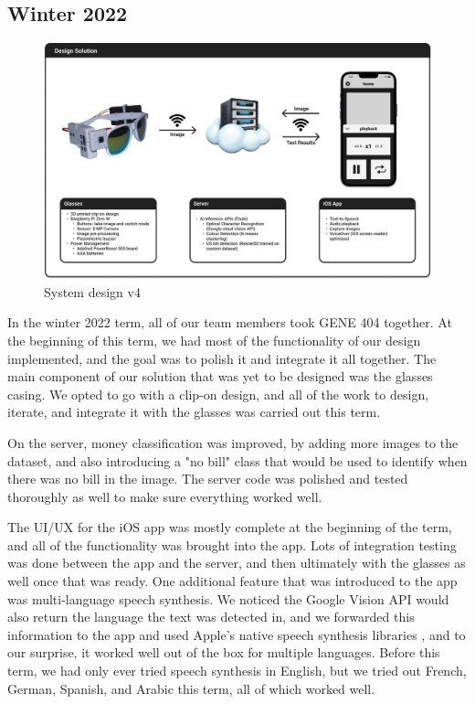 \documentclass[a4paper,11pt]{article}
\begin{document}
\subsection{Winter 2022}
\label{winter-2022-design}
\begin{figure}[H]
\centering
\includegraphics[scale=0.265]{img/system_diagrams/system_diagram_v4.png}
\caption{System design v4}
\label{fig:system_diagram_v4}
\end{figure}

In the winter 2022 term, all of our team members took GENE 404 together. At the beginning of this term, we had most of the functionality of our design implemented, and the goal was to polish it and integrate it all together. The main component of our solution that was yet to be designed was the glasses casing. We opted to go with a clip-on design, and all of the work to design, iterate, and integrate it with the glasses was carried out this term.

On the server, money classification was improved, by adding more images to the dataset, and also introducing a "no bill" class that would be used to identify when there was no bill in the image. The server code was polished and tested thoroughly as well to make sure everything worked well.

The UI/UX for the iOS app was mostly complete at the beginning of the term, and all of the functionality was brought into the app. Lots of integration testing was done between the app and the server, and then ultimately with the glasses as well once that was ready. One additional feature that was introduced to the app was multi-language speech synthesis. We noticed the Google Vision API would also return the language the text was detected in, and we forwarded this information to the app and used Apple's native speech synthesis libraries \cite{apple-speech-synthesis}, and to our surprise, it worked well out of the box for multiple languages. Before this term, we had only ever tried speech synthesis in English, but we tried out French, German, Spanish, and Arabic this term, all of which worked well.
\end{document}
